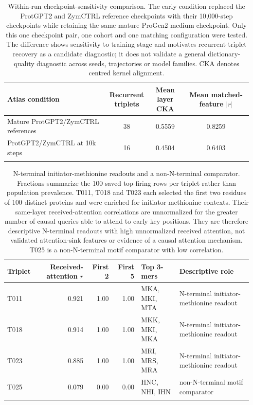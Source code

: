 \documentclass[pdflatex,sn-nature]{sn-jnl}
\begin{document}
\begin{table}[p!]
\caption{Within-run checkpoint-sensitivity comparison. The early condition replaced the ProtGPT2 and ZymCTRL reference checkpoints with their 10,000-step checkpoints while retaining the same mature ProGen2-medium checkpoint. Only this one checkpoint pair, one cohort and one matching configuration were tested. The difference shows sensitivity to training stage and motivates recurrent-triplet recovery as a candidate diagnostic; it does not validate a general dictionary-quality diagnostic across seeds, trajectories or model families. CKA denotes centred kernel alignment.}
\label{tab:supp-qualitydiag}
\scriptsize
\setlength{\tabcolsep}{3pt}
\begin{tabular}{@{}>{\raggedright\arraybackslash}p{4.7cm}ccc@{}}
\toprule
Atlas condition & \shortstack{Recurrent\\triplets} & \shortstack{Mean layer\\CKA} & \shortstack{Mean matched-feature\\$|r|$} \\
\midrule
Mature ProtGPT2/ZymCTRL references & 38 & 0.5559 & 0.8259 \\
ProtGPT2/ZymCTRL at 10k steps & 16 & 0.4504 & 0.6403 \\
\botrule
\end{tabular}
\end{table}

\clearpage

\begin{table}[p!]
\caption{N-terminal initiator-methionine readouts and a non-N-terminal comparator. Fractions summarize the 100 saved top-firing rows per triplet rather than population prevalence. T011, T018 and T023 each selected the first two residues of 100 distinct proteins and were enriched for initiator-methionine contexts. Their same-layer received-attention correlations are unnormalized for the greater number of causal queries able to attend to early key positions. They are therefore descriptive N-terminal readouts with high unnormalized received attention, not validated attention-sink features or evidence of a causal attention mechanism. T025 is a non-N-terminal motif comparator with low correlation.}
\label{tab:supp-nterminal}
\scriptsize
\setlength{\tabcolsep}{2pt}
\begin{tabular}{@{}lrrrl>{\raggedright\arraybackslash}p{3.5cm}@{}}
\toprule
Triplet & Received-attention $r$ & First 2 & First 5 & Top 3-mers & Descriptive role \\
\midrule
T011 & 0.921 & 1.00 & 1.00 & MKA, MKI, MTA & N-terminal initiator-methionine readout \\
T018 & 0.914 & 1.00 & 1.00 & MKK, MKI, MKA & N-terminal initiator-methionine readout \\
T023 & 0.885 & 1.00 & 1.00 & MRI, MRS, MRA & N-terminal initiator-methionine readout \\
T025 & 0.079 & 0.00 & 0.00 & HNC, NHI, IHN & non-N-terminal motif comparator \\
\botrule
\end{tabular}
\end{table}
\end{document}
